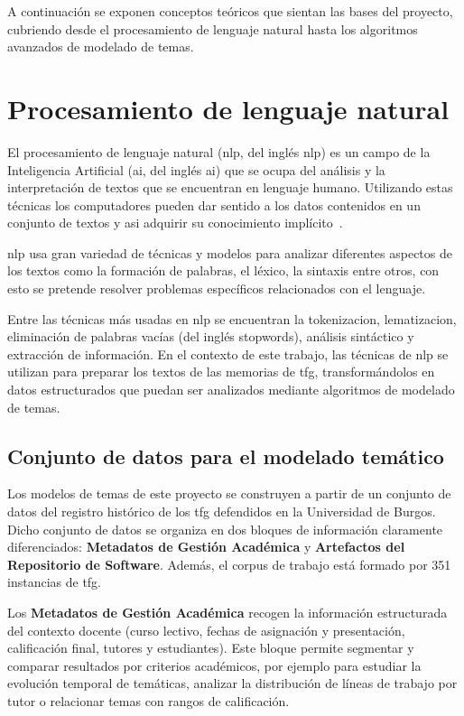 
A continuación se exponen conceptos teóricos que sientan las bases del
proyecto, cubriendo desde el procesamiento de lenguaje natural hasta los
algoritmos avanzados de modelado de temas.

\section{Procesamiento de lenguaje natural}

El procesamiento de lenguaje natural (\acrshort{nlp}, del inglés \acrlong{nlp})
es un campo de la Inteligencia Artificial (\acrshort{ai}, del inglés
\acrlong{ai}) que se ocupa del análisis y la interpretación de textos que se
encuentran en lenguaje humano. Utilizando estas técnicas los computadores
pueden dar sentido a los datos contenidos en un conjunto de textos y asi
adquirir su conocimiento
implícito~\cite{atkinson-abutridyAnaliticaTextual2023}.

\acrshort{nlp} usa gran variedad de técnicas y modelos para analizar diferentes aspectos
de los textos como la formación de palabras, el léxico, la sintaxis entre
otros, con esto se pretende resolver problemas específicos relacionados con el
lenguaje.

Entre las técnicas más usadas en \acrshort{nlp} se encuentran la
\gls{tokenizacion}, \gls{lematizacion}, eliminación de palabras vacías (del
inglés \gls{stopwords}), análisis sintáctico y extracción de información. En el
contexto de este trabajo, las técnicas de \acrshort{nlp} se utilizan para
preparar los textos de las memorias de \acrshort{tfg}, transformándolos en
datos estructurados que puedan ser analizados mediante algoritmos de modelado
de temas.

\subsection{Conjunto de datos para el modelado temático}

Los modelos de temas de este proyecto se construyen a partir de un conjunto de
datos del registro histórico de los \acrfull{tfg} defendidos en la Universidad
de Burgos. Dicho conjunto de datos se organiza en dos bloques de información
claramente diferenciados: \textbf{Metadatos de Gestión Académica} y
\textbf{Artefactos del Repositorio de Software}. Además, el corpus de trabajo
está formado por 351 instancias de \acrshort{tfg}.

Los \textbf{Metadatos de Gestión Académica} recogen la información estructurada
del contexto docente (curso lectivo, fechas de asignación y presentación,
calificación final, tutores y estudiantes). Este bloque permite segmentar y
comparar resultados por criterios académicos, por ejemplo para estudiar la
evolución temporal de temáticas, analizar la distribución de líneas de trabajo
por tutor o relacionar temas con rangos de calificación.

